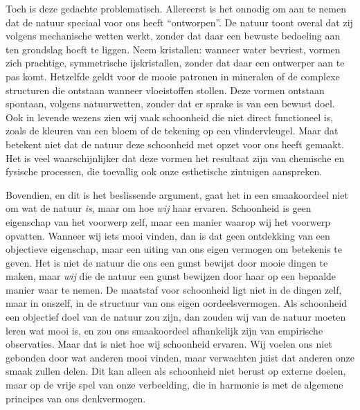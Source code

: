 \begin{mdframed}[leftmargin=0pt,rightmargin=0pt,backgroundcolor=blue!6,linecolor=white,innertopmargin=6pt,innerbottommargin=6pt]
Toch is deze gedachte problematisch. Allereerst is het onnodig om aan te nemen dat de natuur speciaal voor ons heeft ``ontworpen''. De natuur toont overal dat zij volgens mechanische wetten werkt, zonder dat daar een bewuste bedoeling aan ten grondslag hoeft te liggen. Neem kristallen: wanneer water bevriest, vormen zich prachtige, symmetrische ijskristallen, zonder dat daar een ontwerper aan te pas komt. Hetzelfde geldt voor de mooie patronen in mineralen of de complexe structuren die ontstaan wanneer vloeistoffen stollen. Deze vormen ontstaan spontaan, volgens natuurwetten, zonder dat er sprake is van een bewust doel. Ook in levende wezens zien wij vaak schoonheid die niet direct functioneel is, zoals de kleuren van een bloem of de tekening op een vlindervleugel. Maar dat betekent niet dat de natuur deze schoonheid met opzet voor ons heeft gemaakt. Het is veel waarschijnlijker dat deze vormen het resultaat zijn van chemische en fysische processen, die toevallig ook onze esthetische zintuigen aanspreken.

Bovendien, en dit is het beslissende argument, gaat het in een smaakoordeel niet om wat de natuur \textit{is}, maar om hoe \textit{wij} haar ervaren. Schoonheid is geen eigenschap van het voorwerp zelf, maar een manier waarop wij het voorwerp opvatten. Wanneer wij iets mooi vinden, dan is dat geen ontdekking van een objectieve eigenschap, maar een uiting van ons eigen vermogen om betekenis te geven. Het is niet de natuur die ons een gunst bewijst door mooie dingen te maken, maar \textit{wij} die de natuur een gunst bewijzen door haar op een bepaalde manier waar te nemen. De maatstaf voor schoonheid ligt niet in de dingen zelf, maar in onszelf, in de structuur van ons eigen oordeelsvermogen. Als schoonheid een objectief doel van de natuur zou zijn, dan zouden wij van de natuur moeten leren wat mooi is, en zou ons smaakoordeel afhankelijk zijn van empirische observaties. Maar dat is niet hoe wij schoonheid ervaren. Wij voelen ons niet gebonden door wat anderen mooi vinden, maar verwachten juist dat anderen onze smaak zullen delen. Dit kan alleen als schoonheid niet berust op externe doelen, maar op de vrije spel van onze verbeelding, die in harmonie is met de algemene principes van ons denkvermogen.


\end{mdframed}
